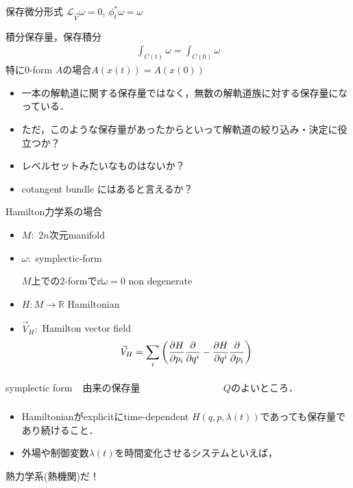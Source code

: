 \documentclass[dvipdfmx]{beamer}
\theoremstyle{break}
\newcommand{\R}{\mathbb{R}}
\renewcommand{\L}{\mathcal{L}}
\begin{document}
\begin{frame}
			\begin{block}{保存微分形式}
					$\L_{\vec{V}}\omega = 0 $, $\phi_t^{*} \omega = \omega$
			\end{block}
			\begin{block}{積分保存量，保存積分}
					\begin{align}
							\int_{C(t)}\omega = \int_{C(0)}\omega
					\end{align}
					特に$0 $-form $A $の場合$A(x(t)) = A(x(0)) $
			\end{block}
			\begin{itemize}
					\item 一本の解軌道に関する保存量ではなく，無数の解軌道族に対する保存量になっている．

					\item ただ，このような保存量があったからといって解軌道の絞り込み・決定に役立つか？

					\item レベルセットみたいなものはないか？

					\item cotangent bundle にはあると言えるか？
			\end{itemize}
\end{frame}


\begin{frame}{Hamilton力学系の場合}
		\begin{itemize}
				\item $M\colon $ $2n $次元manifold
				\item $\omega\colon $ symplectic-form

						$M $上での$2 $-formで$\dd{\omega} = 0 $ non degenerate
				\item $H\colon M\to \R $ Hamiltonian
				\item $\vec{V}_H\colon $ Hamilton vector field
				\begin{align}
						\vec{V}_H = \sum_i\qty(\pdv{H}{p_i}\pdv{}{q^i} - \pdv{H}{q^i}\pdv{}{p_i})
				\end{align}
		\end{itemize}
\end{frame}


\begin{frame}{symplectic form $\color{white}{\omega}$由来の保存量$\color{white}{Q = \displaystyle\int_C\omega \wedge \cdots\wedge\omega} $}
		$Q $のよいところ．
		\begin{itemize}
				\item Hamiltonianがexplicitにtime-dependent $H(q, p, \lambda(t)) $であっても保存量であり続けること．
				\item 外場や制御変数$\lambda(t) $を時間変化させるシステムといえば，
		\end{itemize}
		\begin{center}
		\alert{熱力学系(熱機関)だ！}
		\end{center}
\end{frame}
\end{document}

